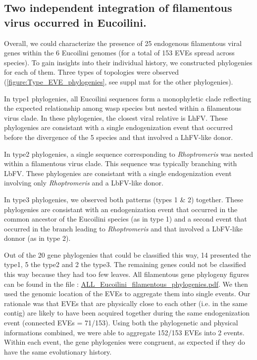\subsection{Two independent integration of filamentous virus occurred in Eucoilini.}

Overall, we could characterize the presence of 25 endogenous filamentous viral genes within the 6 Eucoilini genomes (for a total of 153 EVEs spread across species). To gain insights into their individual history, we constructed phylogenies for each of them. Three types of topologies were observed (\figurename{\ref{figure:Type_EVE_phylogenies}}, see suppl mat for the other phylogenies). 

In type1 phylogenies, all Eucoilini sequences form a monophyletic clade reflecting the expected relationship among wasp species but nested within a filamentous virus clade. In these phylogenies, the closest viral relative is LhFV. These phylogenies are consistant with a single endogenization event that occurred before the divergence of the 5 species and that involved a LhFV-like donor.

In type2 phylogenies, a single sequence corresponding to \textit{Rhoptromeris} was nested within a filamentous virus clade. This sequence was typically branching with LbFV. These phylogenies are consistant with a single endogenization event involving 
only \textit{Rhoptromeris} and a LbFV-like donor.

In type3 phylogenies, we observed both patterns (types 1 \& 2) together. These phylogenies are consistant with an endogenization event that occurred in the common ancestor of the Eucoilini species (as in type 1) and a second event that occurred in the branch leading to \textit{Rhoptromeris} and that involved a LbFV-like donnor (as in type 2). 

Out of the 20 gene phylogenies that could be classified this way, 14 presented the type1, 5 the type2 and 2 the type3. The remaining genes could not be classified this way because they had too few leaves.  All filamentous gene phylogeny figures can be found in the file : \href{https://github.com/BenjaminGuinet/PhD_defense/blob/main/Supplementary_paper3/ALL_Eucoilini_filamentous_phylogenies.pdf}{ALL\_Eucoilini\_filamentous\_phylogenies.pdf}. 
We then used the genomic location of the EVEs to aggregate them into single events. Our rationale was that EVEs that are physically close to each other (i.e. in the same contig) are likely to have been acquired together during the same endogenization event (connected EVEs = 71/153). Using both the phylogenetic and physical informations combined, we were able to aggregate 152/153 EVEs into 2 events. Within each event, the gene phylogenies were congruent, as expected if they do have the same evolutionary history. \\


